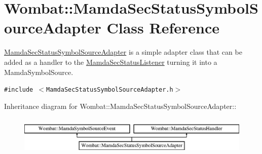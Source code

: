 \hypertarget{classWombat_1_1MamdaSecStatusSymbolSourceAdapter}{
\section{Wombat::Mamda\-Sec\-Status\-Symbol\-Source\-Adapter Class Reference}
\label{classWombat_1_1MamdaSecStatusSymbolSourceAdapter}
}
\hyperlink{classWombat_1_1MamdaSecStatusSymbolSourceAdapter}{Mamda\-Sec\-Status\-Symbol\-Source\-Adapter} is a simple adapter class that can be added as a handler to the \hyperlink{classWombat_1_1MamdaSecStatusListener}{Mamda\-Sec\-Status\-Listener} turning it into a Mamda\-Symbol\-Source.  


{\tt \#include $<$Mamda\-Sec\-Status\-Symbol\-Source\-Adapter.h$>$}

Inheritance diagram for Wombat::Mamda\-Sec\-Status\-Symbol\-Source\-Adapter::\begin{figure}[H]
\begin{center}
\leavevmode
\includegraphics[height=1.90476cm]{classWombat_1_1MamdaSecStatusSymbolSourceAdapter}
\end{center}
\end{figure}
